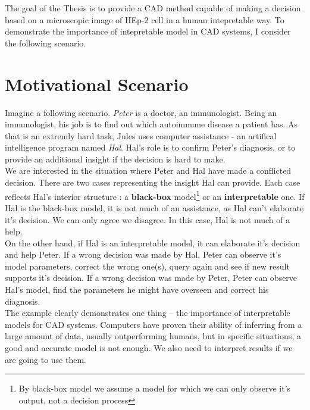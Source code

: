 The goal of the Thesis is to provide a  CAD method capable of making a decision based on a microscopic image of HEp-2 cell in a human intepretable way. To demonstrate the importance of intepretable model in CAD systems, I consider the following scenario.


\section{Motivational Scenario}

Imagine a following scenario. \textit{Peter} is a doctor, an immunologist. Being an immunologist, his job is to find out which autoimmune disease a patient has. As that is an extremly hard task, Jules uses  computer assistance - an artifical intelligence program named \textit{Hal}. Hal's role is to confirm Peter's diagnosis, or to provide an additional insight if the decision is hard to make. \\

We are interested in the situation where Peter and Hal have made a conflicted decision. There are two cases representing the insight Hal can provide. Each case reflects Hal's interior structure : a \textbf{black-box} model\footnote{By black-box model we assume a model for which we can only observe it's output, not a decision process} or an \textbf{ interpretable} one. If Hal is the black-box model, it is not much of an assistance, as Hal can't elaborate it's decision. We can only agree we disagree. In this case, Hal is not much of a help. \\

On the other hand, if Hal is an interpretable model, it can elaborate it's decision and help Peter. If a wrong decision was made by Hal, Peter can observe it's model parameters, correct the wrong one(s), query again and see if new result supports it's decision. If a wrong decision was made by Peter, Peter can observe Hal's model, find the parameters he might have overseen and correct his diagnosis. \\

The example clearly demonstrates one  thing -- the importance of interpretable models for CAD systems. Computers have proven their ability of inferring from a large amount of data, usually outperforming humans, but in specific situations, a good and accurate model is not enough. We also need to interpret results if we are going to use them.

